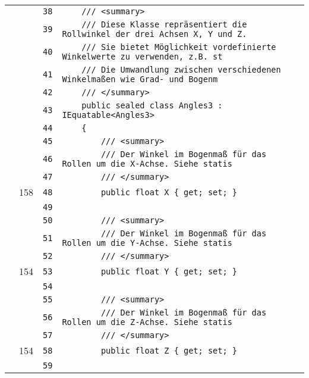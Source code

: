 \documentclass[a4paper,10pt]{article}
\begin{document}
\begin{longtable}[l]{lrrl}
\cellcolor{gray} &  & \verb~38~ & \verb~    /// <summary>~\\
\cellcolor{gray} &  & \verb~39~ & \verb~    /// Diese Klasse repräsentiert die Rollwinkel der drei Achsen X, Y und Z.~\\
\cellcolor{gray} &  & \verb~40~ & \verb~    /// Sie bietet Möglichkeit vordefinierte Winkelwerte zu verwenden, z.B. st~\\
\cellcolor{gray} &  & \verb~41~ & \verb~    /// Die Umwandlung zwischen verschiedenen Winkelmaßen wie Grad- und Bogenm~\\
\cellcolor{gray} &  & \verb~42~ & \verb~    /// </summary>~\\
\cellcolor{gray} &  & \verb~43~ & \verb~    public sealed class Angles3 : IEquatable<Angles3>~\\
\cellcolor{gray} &  & \verb~44~ & \verb~    {~\\
\cellcolor{gray} &  & \verb~45~ & \verb~        /// <summary>~\\
\cellcolor{gray} &  & \verb~46~ & \verb~        /// Der Winkel im Bogenmaß für das Rollen um die X-Achse. Siehe statis~\\
\cellcolor{gray} &  & \verb~47~ & \verb~        /// </summary>~\\
\cellcolor{green} & 158 & \verb~48~ & \verb~        public float X { get; set; }~\\
\cellcolor{gray} &  & \verb~49~ & \verb~~\\
\cellcolor{gray} &  & \verb~50~ & \verb~        /// <summary>~\\
\cellcolor{gray} &  & \verb~51~ & \verb~        /// Der Winkel im Bogenmaß für das Rollen um die Y-Achse. Siehe statis~\\
\cellcolor{gray} &  & \verb~52~ & \verb~        /// </summary>~\\
\cellcolor{green} & 154 & \verb~53~ & \verb~        public float Y { get; set; }~\\
\cellcolor{gray} &  & \verb~54~ & \verb~~\\
\cellcolor{gray} &  & \verb~55~ & \verb~        /// <summary>~\\
\cellcolor{gray} &  & \verb~56~ & \verb~        /// Der Winkel im Bogenmaß für das Rollen um die Z-Achse. Siehe statis~\\
\cellcolor{gray} &  & \verb~57~ & \verb~        /// </summary>~\\
\cellcolor{green} & 154 & \verb~58~ & \verb~        public float Z { get; set; }~\\
\cellcolor{gray} &  & \verb~59~ & \verb~~\\

\end{longtable}
\end{document}
